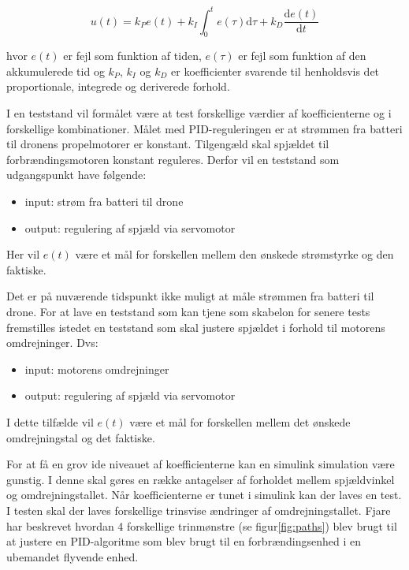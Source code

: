 \begin{equation}
  \label{eq:1}
  u(t)=k_Pe(t)+k_I \int_0^t e(\tau)\mathrm{d}\tau + k_D\frac{\mathrm{d}e(t)}{\mathrm{d}t}
\end{equation}

hvor $e(t)$ er fejl som funktion af tiden, $e(\tau)$ er fejl som funktion af den akkumulerede tid og $k_P$, $k_I$ og $k_D$ er koefficienter svarende til henholdsvis det proportionale, integrede og deriverede forhold.

I en teststand vil formålet være at test forskellige værdier af koefficienterne og i forskellige kombinationer. Målet med PID-reguleringen er at strømmen fra batteri til dronens propelmotorer er konstant. Tilgengæld skal spjældet til forbrændingsmotoren konstant reguleres. Derfor vil en teststand som udgangspunkt have følgende:
\begin{itemize}
\item input: strøm fra batteri til drone
\item output: regulering af spjæld via servomotor
\end{itemize}

Her vil $e(t)$ være et mål for forskellen mellem den ønskede strømstyrke og den faktiske.

Det er på nuværende tidspunkt ikke muligt at måle strømmen fra batteri til drone. For at lave en teststand som kan tjene som skabelon for senere tests fremstilles istedet en teststand som skal justere spjældet i forhold til motorens omdrejninger. Dvs:

\begin{itemize}
\item input: motorens omdrejninger
\item output: regulering af spjæld via servomotor
\end{itemize}

I dette tilfælde vil $e(t)$ være et mål for forskellen mellem det ønskede omdrejningstal og det faktiske.

For at få en grov ide niveauet af koefficienterne kan en simulink simulation være gunstig. I denne skal gøres en række antagelser af forholdet mellem spjældvinkel og omdrejningstallet. Når koefficienterne er tunet i simulink kan der laves en test.
\clearpage
I testen skal der laves forskellige trinsvise ændringer af omdrejningstallet. Fjare\autocite{pid1} har beskrevet hvordan 4 forskellige trinmønstre (se figur\ref{fig:paths}) blev brugt til at justere en PID-algoritme som blev brugt til en forbrændingsenhed i en ubemandet flyvende enhed.

